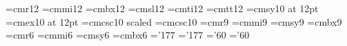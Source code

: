 \font\twelverm=cmr12%
\font\twelvei =cmmi12%
\font\twelvebf=cmbx12%
\font\twelvesl=cmsl12%
\font\twelveit=cmti12%
\font\twelvett=cmtt12%
\font\twelvesy=cmsy10 at 12pt%
\font\twelveex=cmex10 at 12pt%
%
\font\twelvesc=cmcsc10 scaled\magstephalf%
\font\tensc=cmcsc10%
%
\font\ninerm=cmr9%
\font\ninei=cmmi9%
\font\ninesy=cmsy9%
\font\ninebf=cmbx9%
%
\font\sixrm=cmr6%
\font\sixi=cmmi6%
\font\sixsy=cmsy6%
\font\sixbf=cmbx6%
%
\skewchar\ninei='177 \skewchar\sixi='177%
\skewchar\ninesy='60 \skewchar\sixsy='60%
%
%
\def\twelvepoint{\def\rm{\fam0\twelverm}%
 \textfont0=\twelverm \scriptfont0=\ninerm \scriptscriptfont0=\sixrm%
 \textfont1=\twelvei  \scriptfont1=\ninei  \scriptscriptfont1=\sixi%
 \textfont2=\twelvesy \scriptfont2=\ninesy \scriptscriptfont2=\sixsy%
 \textfont3=\twelveex \scriptfont3=\twelveex   \scriptscriptfont3=\twelveex%
 \textfont\itfam=\twelveit \def\it{\fam\itfam\twelveit}%
 \textfont\slfam=\twelvesl \def\sl{\fam\slfam\twelvesl}%
 \textfont\ttfam=\twelvett \def\tt{\fam\ttfam\twelvett}%
 \textfont\bffam=\twelvebf \scriptfont\bffam=\ninebf%
  \scriptscriptfont\bffam=\sixbf \def\bf{\fam\bffam\twelvebf}%
 \normalbaselineskip=14pt%
 \setbox\strutbox=\hbox{\vrule height10pt depth4pt width0pt}%
 \let\sc=\twelvesc%
 \normalbaselines\rm}%
